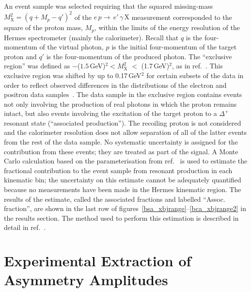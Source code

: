 An event sample was selected requiring
that the squared missing-mass $M_{\textrm{X}}^{2}=(q+M_{p}-q')^{2}$
of the $e\,p \rightarrow\, e'\,\gamma\, \textrm{X}$ measurement
corresponded to the square of the proton mass, $M_{p}$, within the limits of the
energy resolution of the H{\sc ermes} spectrometer (mainly the calorimeter). Recall that $q$ is the
four-momentum of the virtual photon, $p$ is the initial four-momentum
of the target proton and $q'$ is the four-momentum of the produced
photon. The ``exclusive region'' was defined as $-$($1.5$\,GeV)$^{2} <
M_{\textrm{X}}^{2}$ $<$ (1.7\,GeV)$^{2}$, as in
ref.~\cite{Air09}. This exclusive region was shifted by up to
0.17\,GeV$^{2}$ for certain subsets of the data in order to reflect observed differences in the distributions of the electron and positron data samples~\cite{Bur10}. 
The data sample in the exclusive region contains events not only involving the production of real photons in which the proton remains intact, but also
events involving the excitation of the target proton to a $\Delta^+$
resonant state (``associated production''). The recoiling proton is not considered and the calorimeter resolution does not allow separation of all of the latter events from the rest of the data sample.
No systematic uncertainty is assigned for the contribution from these
events; they are treated as part of the signal. A Monte Carlo
calculation based on the parameterisation from ref.~\cite{Bra76} is
used to estimate the fractional contribution to the event sample from resonant
production in each kinematic bin; the uncertainty on this estimate
cannot be adequately quantified because no measurements have been made
in the H{\sc ermes} kinematic region. The results of the estimate, called the associated fractions and labelled ``Assoc. fraction'', are shown in the last row of figures~\ref{bsa_xbjrange}--\ref{bca_xbjrange2} in the results section. The method used to perform this estimation is described in detail in
ref.~\cite{Air08}.

\section{Experimental Extraction of Asymmetry Amplitudes}

